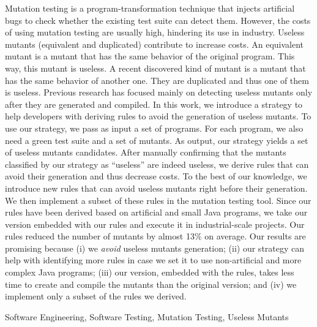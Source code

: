 Mutation testing is a program-transformation technique that injects artificial bugs to check whether the existing test suite can detect them. 
However, the costs of using mutation testing are usually high, hindering its use in industry. 
Useless mutants (equivalent and duplicated) contribute to increase costs. 
An equivalent mutant is a mutant that has the same behavior of the original program. This way, this mutant is useless. A recent discovered kind of mutant is a mutant that has the same behavior of another one. They are duplicated and thus one of them is useless. 
Previous research has focused mainly on detecting useless mutants only after they are generated and compiled. In this work, we introduce a strategy to help developers with deriving rules to avoid the generation of useless mutants. To use our strategy, we pass as input a set of programs. For each program, we also need a green test suite and a set of mutants. As output, our strategy yields a set of useless mutants candidates. After manually confirming that the mutants classified by our strategy as ``useless'' are indeed useless, we derive rules that can avoid their generation and thus decrease costs. To the best of our knowledge, we introduce \NumberOfNewHeuristics new rules that can avoid useless mutants right before their generation. We then implement a subset of these rules in the \mujava{} mutation testing tool. Since our rules have been derived based on artificial and small Java programs, we take our \mujava{} version embedded with our rules and execute it in industrial-scale projects. Our rules reduced the number of mutants by almost 13\% on average. Our results are promising because (i) we \textit{avoid} useless mutants generation; 
(ii) our strategy can help with identifying more rules in case we set it to use non-artificial and more complex Java programs; 
(iii) our \mujava{} version, embedded with the rules, takes less time to create and compile the mutants than the original version;
and (iv) we implement only a subset of the rules we derived. 

\begin{keywords}
Software Engineering, Software Testing, Mutation Testing, Useless Mutants
\end{keywords}